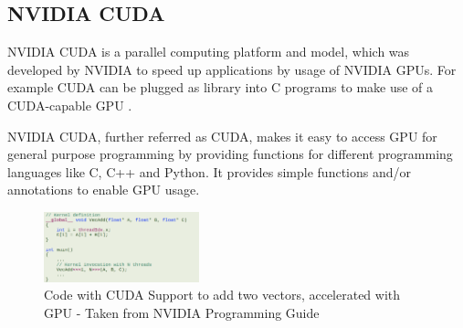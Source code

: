 \documentclass[conference]{IEEEtran}
\begin{document}
			
			
	\subsection{NVIDIA CUDA}
		
		NVIDIA CUDA is a parallel computing platform and model, which was developed by NVIDIA to speed up applications by usage of NVIDIA GPUs. For example CUDA can be plugged as library into C programs to make use of a CUDA-capable GPU \cite{cudacpp}.
		
		NVIDIA CUDA, further referred as CUDA, makes it easy to access GPU for general purpose programming by providing functions for different programming languages like C, C++ and Python. It provides simple functions and/or annotations to enable GPU usage. 
	
		\begin{figure}[htbp]
			\centerline{\includegraphics[width=0.4\textwidth]{CudaCode.png}}
			\caption{Code with CUDA Support to add two vectors, accelerated with GPU - Taken from NVIDIA Programming Guide}
			\label{fig}
		\end{figure}

	
		
\end{document}
